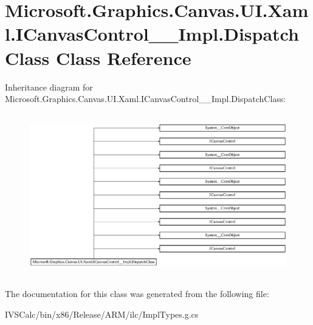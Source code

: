 \hypertarget{class_microsoft_1_1_graphics_1_1_canvas_1_1_u_i_1_1_xaml_1_1_i_canvas_control_____impl_1_1_dispatch_class}{}\section{Microsoft.\+Graphics.\+Canvas.\+U\+I.\+Xaml.\+I\+Canvas\+Control\+\_\+\+\_\+\+Impl.\+Dispatch\+Class Class Reference}
\label{class_microsoft_1_1_graphics_1_1_canvas_1_1_u_i_1_1_xaml_1_1_i_canvas_control_____impl_1_1_dispatch_class}
Inheritance diagram for Microsoft.\+Graphics.\+Canvas.\+U\+I.\+Xaml.\+I\+Canvas\+Control\+\_\+\+\_\+\+Impl.\+Dispatch\+Class\+:\begin{figure}[H]
\begin{center}
\leavevmode
\includegraphics[height=7.113164cm]{class_microsoft_1_1_graphics_1_1_canvas_1_1_u_i_1_1_xaml_1_1_i_canvas_control_____impl_1_1_dispatch_class}
\end{center}
\end{figure}


The documentation for this class was generated from the following file\+:\begin{DoxyCompactItemize}
\item 
I\+V\+S\+Calc/bin/x86/\+Release/\+A\+R\+M/ilc/Impl\+Types.\+g.\+cs\end{DoxyCompactItemize}
